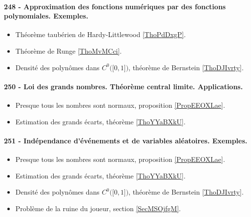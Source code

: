 \paragraph{248 - Approximation des fonctions numériques par des fonctions polynomiales. Exemples.}
\begin{itemize}
    \item Théorème taubérien de Hardy-Littlewood \ref{ThoPdDxgP}.
    \item Théorème de Runge \ref{ThoMvMCci}.
    \item Densité des polynômes dans \( C^0\big( \mathopen[ 0 , 1 \mathclose] \big)\), théorème de Bernstein \ref{ThoDJIvrty}.
\end{itemize}
\paragraph{250 - Loi des grands nombres. Théorème central limite. Applications.}
\begin{itemize}
    \item Presque tous les nombres sont normaux, proposition \ref{PropEEOXLae}.
    \item Estimation des grands écarts, théorème \ref{ThoYYaBXkU}.
\end{itemize}
\paragraph{251 - Indépendance d’événements et de variables aléatoires. Exemples.}
\begin{itemize}
    \item Presque tous les nombres sont normaux, proposition \ref{PropEEOXLae}.
    \item Estimation des grands écarts, théorème \ref{ThoYYaBXkU}.
    \item Densité des polynômes dans \( C^0\big( \mathopen[ 0 , 1 \mathclose] \big)\), théorème de Bernstein \ref{ThoDJIvrty}.
    \item Problème de la ruine du joueur, section \ref{SecMSOjfgM}.
\end{itemize}
